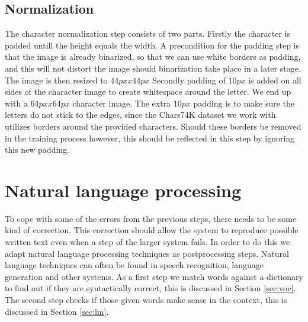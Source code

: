 \documentclass{article}
\begin{document}
\subsection{Normalization}
The character normalization step consists of two parts.
Firstly the character is padded untill the height equals the width.
A precondition for the padding step is that the image is already binarized, so that we can use white borders as padding, and this will not distort the image should binarization take place in a later stage.
The image is then resized to $44px x 44px$
Secondly padding of $10px$ is added on all sides of the character image to create whitespace around the letter.
We end up with a $64px x 64px$ character image.
The extra $10px$ padding is to make sure the letters do not stick to the edges, since the Chars74K dataset we work with utilizes borders around the provided characters. Should these borders be removed in the training process however, this should be reflected in this step by ignoring this new padding.

\section{Natural language processing}
\label{sec:postproc}

To cope with some of the errors from the previous steps, there needs to be some kind of correction. This correction should allow the system to reproduce possible written text even when a step of the larger system fails.
In order to do this we adapt natural language processing techniques as postprocessing steps. Natural language techniques can often be found in speech recognition, language generation and other systems.
As a first step we match words against a dictionary to find out if they are syntactically correct, this is discussed in Section \ref{sec:voc}. The second step checks if those given words make sense in the context, this is discussed in Section \ref{sec:lm}.
\end{document}

